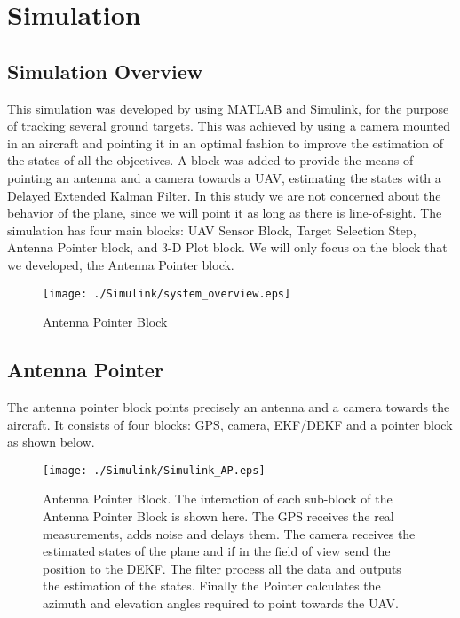 \chapter{Simulation}
\label{ch:simulation}

\section{Simulation Overview}
This simulation was developed by \cite{Sharma2013} using MATLAB and Simulink, for the purpose of tracking several ground targets. This was achieved by using a camera mounted in an aircraft and pointing it in an optimal fashion to improve the estimation of the states of all the objectives. A block was added to provide the means of pointing an antenna and a camera towards a UAV, estimating the states with a Delayed Extended Kalman Filter. In this study we are not concerned about the behavior of the plane, since we will point it as long as there is line-of-sight. The simulation has four main blocks: UAV Sensor Block, Target Selection Step, Antenna Pointer block, and 3-D Plot block. We will only focus on the block that we developed, the Antenna Pointer block.

\begin{figure}[h!]
  \texttt{[image: ./Simulink/system\_overview.eps]}
  \label{fig:system_overview}
  \caption[Antenna Pointer Block]{Antenna Pointer Block}
\end{figure}


\section{Antenna Pointer}
The antenna pointer block points precisely an antenna and a camera towards the aircraft. It consists of four blocks: GPS, camera, EKF/DEKF and a pointer block as shown below.
 
\begin{figure}[h!]
  \texttt{[image: ./Simulink/Simulink\_AP.eps]}
  \label{fig:AP}
  \caption[Antenna Pointer Block]{Antenna Pointer Block. The interaction of each sub-block of the Antenna Pointer Block is shown here. The GPS receives the real measurements, adds noise and delays them. The camera receives the estimated states of the plane and if in the field of view send the position to the DEKF. The filter process all the data and outputs the estimation of the states. Finally the Pointer calculates the azimuth and elevation angles required to point towards the UAV.}
\end{figure}

